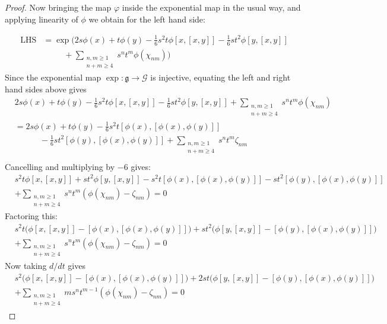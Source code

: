 \documentclass[honours]{UNSWthesis}
\newcommand{\G}{\mathcal{G}}
\newcommand{\g}{\mathfrak{g}}
\newcommand{\1}{\mathbf{e}_{1}}
\newcommand{\2}{\mathbf{e}_{3}}
\newcommand{\3}{\mathbf{e}_{3}}
\begin{document}
\begin{proof}
Now bringing the map $\varphi$ inside the exponential map in the usual way, and applying linearity of $\phi$ we obtain for the left hand side:

\begin{align*}
\text{LHS} &=  \exp \bigg( 
2s\phi(x)+t\phi(y)-\frac{1}{6}s^{2}t\phi[x,[x,y]] -\frac{1}{6}st^{2}\phi[y,[x,y]] \\
&\;\;\;\;\;\;\;\;\;  +\sum\limits_{\substack{n,m \geq 1  \\ n+m \geq 4}} s^{n}t^{m}\phi(\chi_{nm}) \bigg)
\end{align*}
Since the exponential map $\exp: \g \longrightarrow \G$ is injective, equating the left and right hand sides above gives
\begin{align*}
&2s\phi(x)+t\phi(y)-\frac{1}{6}s^{2}t\phi[x,[x,y]] -\frac{1}{6}st^{2}\phi[y,[x,y]]+\sum\limits_{\substack{n,m \geq 1  \\ n+m \geq 4}}s^{n}t^{m}\phi(\chi_{nm}) \\[.7em]
&=2s\phi(x)+t\phi(y)-\frac{1}{6}s^{2}t[\phi(x),[\phi(x),\phi(y)]]\\[.7em]
&\quad \quad \quad -\frac{1}{6}st^{2}[\phi(y),[\phi(x),\phi(y)]]+\sum\limits_{\substack{n,m \geq 1  \\ n+m \geq 4}}s^{n}t^{m}\zeta_{nm} \\
\end{align*}
Cancelling and multiplying by $-6$ gives:
\begin{align*}
&s^{2}t\phi[x,[x,y]]+st^{2}\phi[y,[x,y]]-s^{2}t[\phi(x),[\phi(x),\phi(y)]]-st^{2}[\phi(y),[\phi(x),\phi(y)]] \\
&+\sum\limits_{\substack{n,m \geq 1\\ n+m \geq 4}}s^{n}t^{m}(\phi(\chi_{nm})- \zeta_{nm})=0
\end{align*}
Factoring this:
\begin{align*}
&s^{2}t\big(\phi[x,[x,y]]-[\phi(x),[\phi(x),\phi(y)]]\big)+st^{2}\big(\phi[y,[x,y]]-[\phi(y),[\phi(x),\phi(y)]]\big) \\
&+\sum\limits_{\substack{n,m \geq 1\\ n+m \geq 4}}s^{n}t^{m}(\phi(\chi_{nm})- \zeta_{nm})=0
\end{align*}
Now taking $d/dt$ gives
\begin{align*}
&s^{2}\big(\phi[x,[x,y]]-[\phi(x),[\phi(x),\phi(y)]]\big)+2st\big(\phi[y,[x,y]]-[\phi(y),[\phi(x),\phi(y)]]\big) \\
&+\sum\limits_{\substack{n,m \geq 1\\ n+m \geq 4}}m s^{n}t^{m-1}(\phi(\chi_{nm})- \zeta_{nm})=0

\end{align*}
\end{proof}
\end{document}
